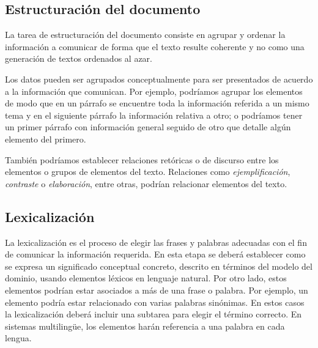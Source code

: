 \subsection{Estructuración del documento}
La tarea de estructuración del documento consiste en agrupar y ordenar la información a comunicar de forma que el texto resulte coherente y no como una generación de textos ordenados al azar.

Los datos pueden ser agrupados conceptualmente para ser presentados de acuerdo a la información que comunican. Por ejemplo, podríamos agrupar los elementos de modo que en un párrafo se encuentre toda la información referida a un mismo tema y en el siguiente párrafo la información relativa a otro; o podríamos tener un primer párrafo con información general seguido de otro que detalle algún elemento del primero.

También podríamos establecer relaciones retóricas o de discurso entre los elementos o grupos de elementos del texto. Relaciones como \emph{ejemplificación}, \emph{contraste} o \emph{elaboración}, entre otras, podrían relacionar elementos del texto.  


\subsection{Lexicalización}
La lexicalización es el proceso de elegir las frases y palabras adecuadas con el fin de comunicar la información requerida.
En esta etapa se deberá establecer como se expresa un significado conceptual concreto, descrito en términos del modelo del dominio, usando elementos léxicos en lenguaje natural. Por otro lado, estos elementos podrían estar asociados a más de una frase o palabra. Por ejemplo, un elemento podría estar relacionado con varias palabras sinónimas. En estos casos la lexicalización deberá incluir una subtarea para elegir el término correcto. En sistemas multilingüe, los elementos harán referencia a una palabra en cada lengua.


